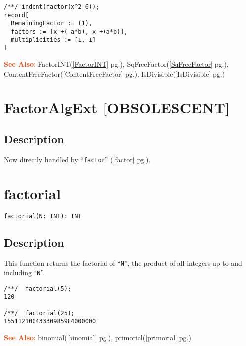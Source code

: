 \documentclass[a4paper]{mybook}
\newenvironment{command}{}{} %
\newcommand\SeeAlso{\par\textcolor{OrangeRed}{\textbf{\large See Also: }}}
\begin{document}
\begin{command}
\begin{Verbatim}[label=example, rulecolor=\color{PineGreen}, frame=single]
/**/ indent(factor(x^2-6));
record[
  RemainingFactor := (1),
  factors := [x +(-a*b), x +(a*b)],
  multiplicities := [1, 1]
]
\end{Verbatim}


\SeeAlso %
  FactorINT(\ref{FactorINT} pg.\pageref{FactorINT}), 
    SqFreeFactor(\ref{SqFreeFactor} pg.\pageref{SqFreeFactor}), 
    ContentFreeFactor(\ref{ContentFreeFactor} pg.\pageref{ContentFreeFactor}), 
    IsDivisible(\ref{IsDivisible} pg.\pageref{IsDivisible})
\end{command} %

\section{FactorAlgExt [OBSOLESCENT]}
\label{FactorAlgExt [OBSOLESCENT]}
\begin{command} %



\subsection*{Description}

Now directly handled by ``\verb&factor&'' (\ref{factor} pg.\pageref{factor}).

\end{command} %

\section{factorial}
\label{factorial}
\begin{command} %


\begin{Verbatim}[label=syntax, rulecolor=\color{MidnightBlue},
frame=single]
factorial(N: INT): INT
    \end{Verbatim}


\subsection*{Description}

This function returns the factorial of ``\verb&N&'', the product
of all integers up to and including ``\verb&N&''.
\begin{Verbatim}[label=example, rulecolor=\color{PineGreen}, frame=single]
/**/  factorial(5);
120

/**/  factorial(25);
15511210043330985984000000
\end{Verbatim}


\SeeAlso %
  binomial(\ref{binomial} pg.\pageref{binomial}), 
    primorial(\ref{primorial} pg.\pageref{primorial})
\end{command} %
\end{document}
